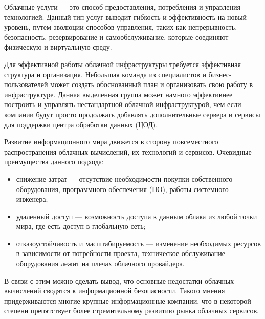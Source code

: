 
Облачные услуги --- это способ предоставления, потребления и управления технологией.
Данный тип услуг выводит гибкость и эффективность на новый уровень, путем эволюции способов управления, таких как непрерывность, безопасность, резервирование и самообслуживание, которые соединяют физическую и виртуальную среду.

Для эффективной работы облачной инфраструктуры требуется эффективная структура и организация.
Небольшая команда из специалистов и бизнес-пользователей может создать обоснованный план и организовать свою работу в инфраструктуре.
Данная выделенная группа может намного эффективнее построить и управлять нестандартной облачной инфраструктурой, чем если компании будут просто продолжать добавлять дополнительные сервера и сервисы для поддержки центра обработки данных (ЦОД).

Развитие информационного мира движется в сторону повсеместного распространения облачных вычислений, их технологий и сервисов.
Очевидные преимущества данного подхода: \cite{telecom-world}
\begin{itemize}
  \item снижение затрат --- отсутствие необходимости покупки собственного оборудования, программного обеспечения (ПО), работы системного инженера;
  \item удаленный доступ --- возможность доступа к данным облака из любой точки мира, где есть доступ в глобальную сеть;
  \item отказоустойчивость и масштабируемость --- изменение необходимых ресурсов в зависимости от потребности проекта, техническое обслуживание оборудования лежит на плечах облачного провайдера.
\end{itemize}

В связи с этим можно сделать вывод, что основные недостатки облачных вычислений сводятся к информационной безопасности.
Такого мнения придерживаются многие крупные информационные компании, что в некоторой степени препятствует более стремительному развитию рынка облачных сервисов.

\clearpage
